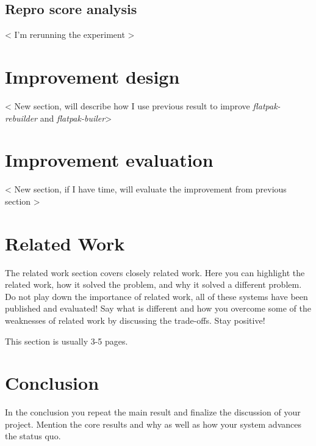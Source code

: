 \documentclass[a4paper,11pt,oneside]{report}
\newcommand{\sysname}{\emph{flatpak-rebuilder}\xspace}
\newcommand{\fb}{\emph{flatpak-builer}\xspace}
\begin{document}
\section{Repro score analysis}
< I'm rerunning the experiment >


\chapter{Improvement design}
< New section, will describe how I use previous result to improve \sysname and \fb >

\chapter{Improvement evaluation}
< New section, if I have time, will evaluate the improvement from previous section >


\chapter{Related Work}

The related work section covers closely related work. Here you can highlight
the related work, how it solved the problem, and why it solved a different
problem. Do not play down the importance of related work, all of these
systems have been published and evaluated! Say what is different and how
you overcome some of the weaknesses of related work by discussing the
trade-offs. Stay positive!

This section is usually 3-5 pages.


\chapter{Conclusion}

In the conclusion you repeat the main result and finalize the discussion of
your project. Mention the core results and why as well as how your system
advances the status quo.

\cleardoublepage
{}
{}
\printbibliography
\end{document}
